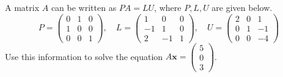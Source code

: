 \documentclass[12pt,letterpaper]{exam}
\begin{document}
\begin{questions}
\newpage
\question[10] A matrix $A$ can be written as $PA= LU$, where $P, L, U$ are given below.
	\[
	P= \begin{pmatrix} 0 & 1 & 0 \\ 1 & 0 & 0 \\ 0 & 0 & 1 \end{pmatrix}, \quad L= \begin{pmatrix} 1 & 0 & 0 \\ -1 & 1 & 0 \\ 2 & -1 & 1 \end{pmatrix}, \quad U= \begin{pmatrix} 2 & 0 & 1 \\ 0 & 1 & -1 \\ 0 & 0 & -4 \end{pmatrix}
	\]
Use this information to solve the equation $A\mathbf{x}= \begin{pmatrix} 5 \\ 0 \\ 3 \end{pmatrix}$. \par\vspace{0.3cm}


\end{questions}
\end{document}
